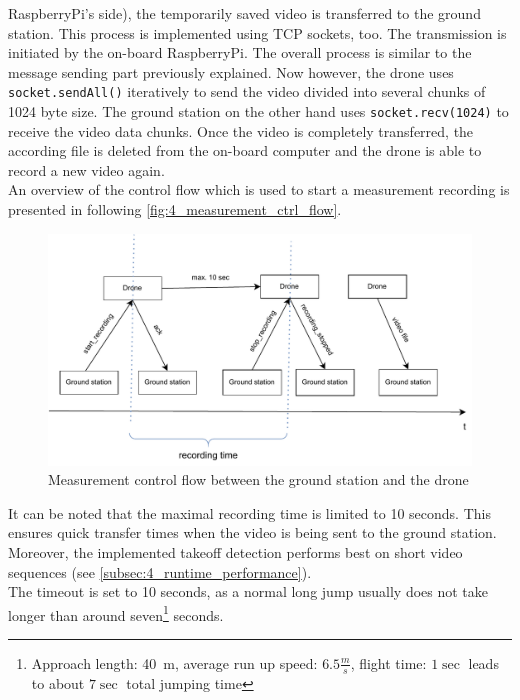 RaspberryPi's side), the temporarily saved video is transferred to the ground
station.
This process is implemented using \ac{TCP} sockets, too.
The transmission is initiated by the on-board RaspberryPi.
The overall process is similar to the message sending part previously
explained.
Now however, the drone uses \texttt{socket.sendAll()} iteratively to send the
video divided into several chunks of 1024 byte size.
The ground station on the other hand uses \texttt{socket.recv(1024)} to
receive the video data chunks.
Once the video is completely transferred, the according file is deleted from
the on-board computer and the drone is able to record a new video again.\\
An overview of the control flow which is used to start a measurement recording
is presented in following \autoref{fig:4_measurement_ctrl_flow}.\\
\begin{figure}[h!]
    \centering
    \includegraphics[scale=0.7]{request_flow.pdf}
    \caption[Measurement control flow between ground station and drone]{
        Measurement control flow between the ground station and the drone}
    \label{fig:4_measurement_ctrl_flow}
\end{figure}
\noindent It can be noted that the maximal recording time is limited to 10
seconds.
This ensures quick transfer times when the video is being sent to the ground
station.
Moreover, the implemented takeoff detection performs best on short video
sequences (see \autoref{subsec:4_runtime_performance}).\\
The timeout is set to 10 seconds, as a normal long jump usually does not take
longer than around seven\footnote{Approach length: 40 m, average run up speed:
$6.5\frac{m}{s}$, flight time: $1\sec$ leads to about $7\sec$ total jumping
time} seconds.

